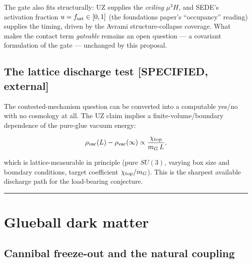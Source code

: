 \documentclass[preprint,12pt]{elsarticle}
\begin{document}
The gate also fits structurally: UZ supplies the \emph{ceiling}
\(\mu^3 H\), and SEDE's activation fraction
\(u = f_{\rm sat} \in [0,1]\) (the foundations paper's ``occupancy''
reading) supplies the timing, driven by the Avrami structure-collapse
coverage. What makes the contact term \emph{gateable} remains an open
question --- a covariant formulation of the gate --- unchanged by this
proposal.

\subsection{The lattice discharge test {[}SPECIFIED,
external{]}}\label{sec-4-3}

The contested-mechanism question can be converted into a computable
yes/no with no cosmology at all. The UZ claim implies a
finite-volume/boundary dependence of the pure-glue vacuum energy:

\begin{equation}\rho_{\rm vac}(L) - \rho_{\rm vac}(\infty) \propto \frac{\chi_{\rm top}}{m_G\, L},\end{equation}

which is lattice-measurable in principle (pure \(SU(3)\), varying box
size and boundary conditions, target coefficient
\(\chi_{\rm top}/m_G\)). This is the sharpest available discharge path
for the load-bearing conjecture.

\begin{center}\rule{0.5\linewidth}{0.5pt}\end{center}

\section{Glueball dark matter}\label{sec-5}

\subsection{Cannibal freeze-out and the natural coupling}\label{sec-5-1}
\end{document}
